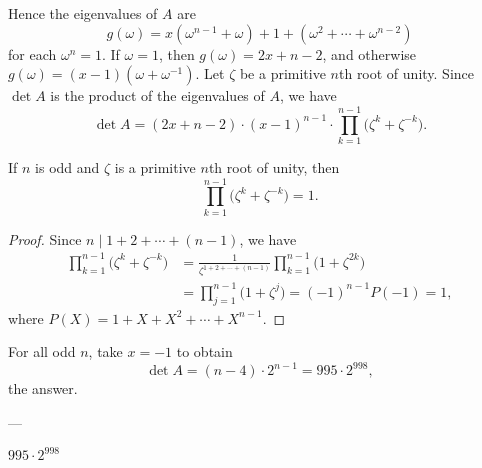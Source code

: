 Hence the eigenvalues of $A$ are \[g(\omega)=x(\omega^{n-1}+\omega)+1+(\omega^2+\cdots+\omega^{n-2})\]
for each $\omega^n=1$. If $\omega=1$, then $g(\omega)=2x+n-2$, and otherwise $g(\omega)=(x-1)(\omega+\omega^{-1})$. Let $\zeta$ be a primitive $n$th root of unity. Since $\det A$ is the product of the eigenvalues of $A$, we have \[\det A=(2x+n-2)\cdot(x-1)^{n-1}\cdot\prod_{k=1}^{n-1}\Big(\zeta^k+\zeta^{-k}\Big).\]
\begin{iclaim*}
    If $n$ is odd and $\zeta$ is a primitive $n$th root of unity, then \[\prod_{k=1}^{n-1}\Big(\zeta^k+\zeta^{-k}\Big)=1.\]
\end{iclaim*}
\begin{proof}
    Since $n\mid 1+2+\cdots+(n-1)$, we have
    \begin{align*}
        \prod_{k=1}^{n-1}\Big(\zeta^k+\zeta^{-k}\Big)&=\frac1{\zeta^{1+2+\cdots+(n-1)}}\prod_{k=1}^{n-1}\Big(1+\zeta^{2k}\Big)\\
        &=\prod_{j=1}^{n-1}\Big(1+\zeta^j\Big)
        =(-1)^{n-1}P(-1)=1,
    \end{align*}
    where $P(X)=1+X+X^2+\cdots+X^{n-1}$.
\end{proof}

For all odd $n$, take $x=-1$ to obtain \[\det A=(n-4)\cdot2^{n-1}=995\cdot2^{998},\]
the answer.

---

$995\cdot2^{998}$
